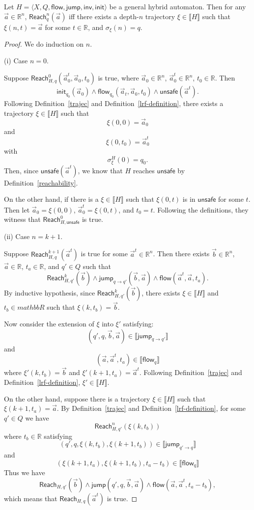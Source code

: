 \documentclass[envcountsect]{llncs}
\newcommand{\flow}{\mathsf{flow}}
\newcommand{\jump}{\mathsf{jump}}
\newcommand{\inv}{\mathsf{inv}}
\newcommand{\init}{\mathsf{init}}
\newcommand{\reach}{\mathsf{Reach}}
\newcommand{\unsafe}{\mathsf{unsafe}}
\begin{document}
\begin{proposition}\label{with-inv}
Let $H = \langle X, Q, \flow, \jump, \inv, \init \rangle$ be a general hybrid automaton. Then for any $\vec a\in \mathbb{R}^n$, $\reach^n_q(\vec a)$ iff there exists a depth-$n$ trajectory $\xi\in\llbracket H\rrbracket$ such that $\xi(n, t) = \vec a$ for some $t\in\mathbb{R}$, and $\sigma_{\xi}(n) = q$. 
\end{proposition}


\begin{proof}
We do induction on $n$.

(i) Case $n=0$.

Suppose $\reach^0_{H,q}(\vec a_0^t, \vec a_0, t_0)$ is true, where $\vec a_0\in \mathbb{R}^n$, $\vec a_0^t\in \mathbb{R}^n$, $t_0\in \mathbb{R}$. Then
$$\init_{q_0}(\vec a_0)\wedge\flow_{q_0}(\vec a_t, \vec a_0, t_0) \wedge \unsafe(\vec a^t).$$
Following Definition~\ref{trajec} and Definition~\ref{lrf-definition}, there exists a trajectory $\xi\in \llbracket H\rrbracket$ such that
$$\xi(0,0) = \vec a_0$$
and 
$$\xi(0,t_0) = \vec a_0^t$$
with 
$$\sigma^H_{\xi}(0) = q_0.$$
Then, since $\unsafe(\vec a^t)$, we know that $H$ reaches $\unsafe$ by Definition~\ref{reachability}.

On the other hand, if there is a $\xi\in \llbracket H\rrbracket$ such that $\xi(0,t)$ is in $\unsafe$ for some $t$. Then let $\vec a_0 = \xi(0,0)$, $\vec a_0^t = \xi(0,t)$, and $t_0 = t$. Following the definitions, they witness that $\reach^0_{H,\unsafe}$ is true. 

(ii) Case $n=k+1$. 
 
Suppose $\reach_{H,q}^{k+1}(\vec a^t)$ is true for some $\vec a^t\in\mathbb{R}^n$. Then there exists $\vec b\in \mathbb{R}^n$, $\vec a\in \mathbb{R}$, $t_a\in \mathbb{R}$, and $q'\in Q$ such that
$$\reach_{H,q'}^k(\vec b) \wedge \jump_{q\rightarrow q'}(\vec b, \vec a)\wedge \flow(\vec a^t, \vec a, t_a).$$ 
By inductive hypothesis, since $\reach_{H,q'}^k(\vec b)$, there exists $\xi\in\llbracket H\rrbracket$ and $t_b\in mathbb{R}$ such that $\xi(k, t_b) = \vec b$. 


Now consider the extension of $\xi$ into $\xi'$ satisfying:
$$(q', q, \vec b, \vec a)\in \llbracket \jump_{q\rightarrow q'}\rrbracket$$
and 
$$(\vec a, \vec a^t, t_a)\in \llbracket \flow_q \rrbracket$$
where $\xi'(k,t_b) = \vec b$ and $\xi'(k+1, t_a) = \vec a^t$. Following Definition~\ref{trajec} and Definition~\ref{lrf-definition}, $\xi'\in \llbracket H\rrbracket$. 

On the other hand, suppose there is a trajectory $\xi\in\llbracket H\rrbracket$ such that $\xi(k+1, t_a) = \vec a$. By Definition~\ref{trajec} and Definition~\ref{lrf-definition}, for some $q'\in Q$ we have
$$\reach^n_{H,q'}(\xi(k,t_b))$$
where $t_b\in\mathbb{R}$ satisfying
$$(q', q, \xi(k,t_b), \xi(k+1,t_b))\in \llbracket \jump_{q'\rightarrow q} \rrbracket$$
and
$$(\xi(k+1,t_a), \xi(k+1,t_b), t_a - t_b)\in \llbracket \flow_q\rrbracket$$
Thus we have 
$$\reach_{H,q'}(\vec b)\wedge \jump(q',q,\vec b, \vec a)\wedge \flow(\vec a, \vec a^t, t_a-t_b),$$
which means that $\reach_{H,q}(\vec a^t)$ is true. 
\end{proof}
\end{document}
